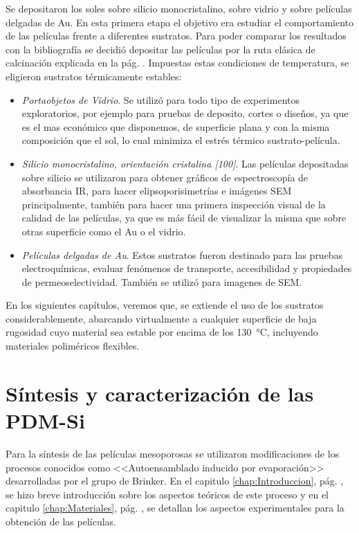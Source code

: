 	Se depositaron los soles sobre silicio monocristalino, sobre vidrio y sobre películas delgadas de Au. En esta primera etapa el objetivo era estudiar el comportamiento de las películas frente a diferentes sustratos. Para poder comparar los resultados con la bibliografía\cite{Soler-Illia2006,Brinker1990} se decidió depositar las películas por la ruta clásica de calcinación explicada en la pág. \pageref{sec:cond_y_extr}. Impuestas estas condiciones de temperatura, se eligieron sustratos térmicamente estables:
		\begin{itemize}

			\item \textit{Portaobjetos de Vidrio}. Se utilizó para todo tipo de experimentos exploratorios, por ejemplo para pruebas de deposito, cortes o diseños, ya que es el mas económico que disponemos, de superficie plana y con la misma composición que el sol, lo cual minimiza el estrés térmico sustrato-película.

			\item \textit{Silicio monocristalino, orientación cristalina [100]}. Las películas depositadas sobre silicio se utilizaron para obtener gráficos de espectroscopía de absorbancia IR, para hacer elipsoporisimetrías e imágenes SEM principalmente, también para hacer una primera inspección visual de la calidad de las películas, ya que es más fácil de visualizar la misma que sobre otras superficie como el Au o el vidrio. 

			\item \textit{Películas delgadas de Au}. Estos sustratos fueron destinado para las pruebas electroquímicas, evaluar fenómenos de transporte, accesibilidad y propiedades de permeoselectividad. También se utilizó para imagenes de SEM.

			\end{itemize}
	
	En los siguientes capítulos, veremos que, se extiende el uso de los sustratos considerablemente, abarcando virtualmente a cualquier superficie de baja rugosidad cuyo material sea estable por encima de los \SI{130}{\celsius}, incluyendo materiales poliméricos flexibles.

\section{Síntesis y caracterización de las PDM-Si}
		
	Para la síntesis de las películas mesoporosas se utilizaron modificaciones de los procesos conocidos como <<Autoensamblado inducido por evaporación>> desarrolladas por el grupo de Brinker.\cite{Brinker1999} En el capitulo \ref{chap:Introduccion}, pág. \pageref{sec:mesoporosos}, se hizo breve introducción sobre los aspectos teóricos de este proceso y en el capitulo \ref{chap:Materiales}, pág. \pageref{sec:sintesis_mesoporosos}, se detallan los aspectos experimentales para la obtención de las películas.

